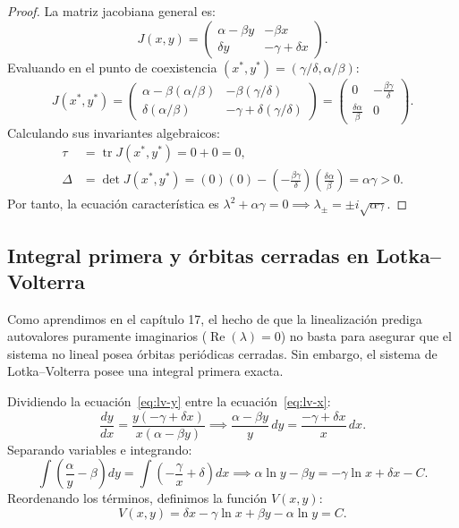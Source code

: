 \begin{proof}
La matriz jacobiana general es:
\begin{equation}
    J(x,y) = \begin{pmatrix} \alpha - \beta y & -\beta x \\ \delta y & -\gamma + \delta x \end{pmatrix}.
\end{equation}
Evaluando en el punto de coexistencia $(x^*, y^*) = (\gamma/\delta, \alpha/\beta)$:
\begin{equation}
    J(x^{*}, y^{*}) = \begin{pmatrix} \alpha - \beta(\alpha/\beta) & -\beta(\gamma/\delta) \\ \delta(\alpha/\beta) & -\gamma + \delta(\gamma/\delta) \end{pmatrix} = \begin{pmatrix} 0 & -\frac{\beta\gamma}{\delta} \\ \frac{\delta\alpha}{\beta} & 0 \end{pmatrix}.
\end{equation}
Calculando sus invariantes algebraicos:
\begin{align}
    \tau &= \operatorname{tr} J(x^*, y^*) = 0 + 0 = 0, \\
    \Delta &= \det J(x^*, y^*) = (0)(0) - \left(-\frac{\beta\gamma}{\delta}\right)\left(\frac{\delta\alpha}{\beta}\right) = \alpha\gamma > 0.
\end{align}
Por tanto, la ecuación característica es $\lambda^2 + \alpha\gamma = 0 \implies \lambda_{\pm} = \pm i\sqrt{\alpha\gamma}$.
\end{proof}

\subsection{Integral primera y órbitas cerradas en Lotka--Volterra}

Como aprendimos en el capítulo 17, el hecho de que la linealización prediga autovalores puramente imaginarios ($\operatorname{Re}(\lambda) = 0$) no basta para asegurar que el sistema no lineal posea órbitas periódicas cerradas. Sin embargo, el sistema de Lotka--Volterra posee una integral primera exacta.

Dividiendo la ecuación~\eqref{eq:lv-y} entre la ecuación~\eqref{eq:lv-x}:
\begin{equation}
    \frac{dy}{dx} = \frac{y(-\gamma + \delta x)}{x(\alpha - \beta y)} \implies \frac{\alpha - \beta y}{y}\, dy = \frac{-\gamma + \delta x}{x}\, dx.
\end{equation}
Separando variables e integrando:
\begin{equation}
    \int \left( \frac{\alpha}{y} - \beta \right) dy = \int \left( -\frac{\gamma}{x} + \delta \right) dx \implies \alpha \ln y - \beta y = -\gamma \ln x + \delta x - C.
\end{equation}
Reordenando los términos, definimos la función $V(x,y)$:
\begin{equation}
    V(x,y) = \delta x - \gamma \ln x + \beta y - \alpha \ln y = C.
    \label{eq:lv_primer_integral}
\end{equation}

